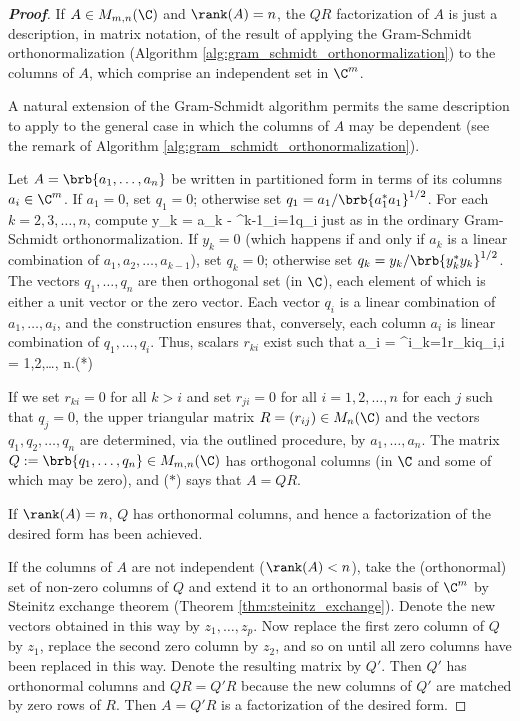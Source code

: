 \begin{proof}[\bf Proof]%
If $A\in M_{m,n}(\C)$ and $\rank (A) = n$, the $QR$ factorization of $A$ is just a description, in matrix notation, of the result of applying the Gram-Schmidt orthonormalization (Algorithm
\ref{alg:gram_schmidt_orthonormalization}) to the columns of $A$, which comprise an independent set in $\C^m$.

A natural extension of the Gram-Schmidt algorithm permits the same description to apply to the general case in which the columns of $A$ may be dependent (see the remark of Algorithm
\ref{alg:gram_schmidt_orthonormalization}).

Let $A = \brb{a_1,\dots,a_n}$ be written in partitioned form in terms of its columns $a_i\in \C^m$. If $a_1 = 0$, set $q_1 = 0$; otherwise set $q_1 = a_1 /\brb{a_1^*a_1}^{1/2}$. For each
$k=2,3,\dots,n$, compute
\be
y_k = a_k - \sum^{k-1}_{i=1}q_i
\ee
just as in the ordinary Gram-Schmidt orthonormalization. If $y_k = 0$ (which happens if and only if $a_k$ is a linear combination of $a_1,a_2,\dots,a_{k-1}$), set $q_k = 0$; otherwise set $q_k = y_k
/ \brb{y_k^*y_k}^{1/2}$. The vectors $q_1,\dots,q_n$ are then orthogonal set (in $\C$), each element of which is either a unit vector or the zero vector. Each vector $q_i$ is a linear combination of
$a_1,\dots,a_i$, and the construction ensures that, conversely, each column $a_i$ is linear combination of $q_1,\dots,q_i$. Thus, scalars $r_{ki}$ exist such that
\be
a_i = \sum^i_{k=1}r_{ki}q_i,\qquad i = 1,2,\dots, n.\qquad (*)
\ee

If we set $r_{ki}=0$ for all $k>i$ and set $r_{ji} = 0$ for all $i = 1,2,\dots,n$ for each $j$ such that $q_j = 0$, the upper triangular matrix $R = (r_{ij})\in M_n(\C)$ and the vectors
$q_1,q_2,\dots,q_n$ are determined, via the outlined procedure, by $a_1,\dots,a_n$. The matrix $Q := \brb{q_1,\dots,q_n}\in M_{m,n}(\C)$ has orthogonal columns (in $\C$ and some of which may be
zero), and ($*$) says that $A = QR$.

If $\rank(A) = n$, $Q$ has orthonormal columns, and hence a factorization of the desired form has been achieved.

If the columns of $A$ are not independent ($\rank(A) < n$), take the (orthonormal) set of non-zero columns of $Q$ and extend it to an orthonormal basis of $\C^m$ by Steinitz exchange theorem
(Theorem \ref{thm:steinitz_exchange}). Denote the new vectors obtained in this way by $z_1,\dots,z_p$. Now replace the first zero column of $Q$ by $z_1$, replace the second zero column by $z_2$, and
so on until all zero columns have been replaced in this way. Denote the resulting matrix by $Q'$. Then $Q'$ has orthonormal columns and $QR = Q'R$ because the new columns of $Q'$ are matched by
zero rows of $R$. Then $A = Q'R$ is a factorization of the desired form.


\end{proof}
